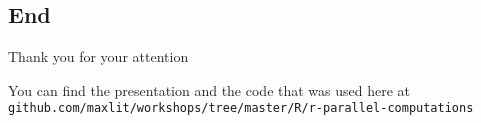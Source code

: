 \documentclass[bigger]{beamer}
\begin{document}
\subsection{End}
\label{sec-3-18}
\begin{frame}[label=sec-3-18-1]{Thank you for your attention}
\end{frame}
\begin{frame}[label=sec-3-18-2]{You can find the presentation and the code that was used here at}
\texttt{github.com/maxlit/workshops/tree/master/R/r-parallel-computations}
\end{frame}
\end{document}
